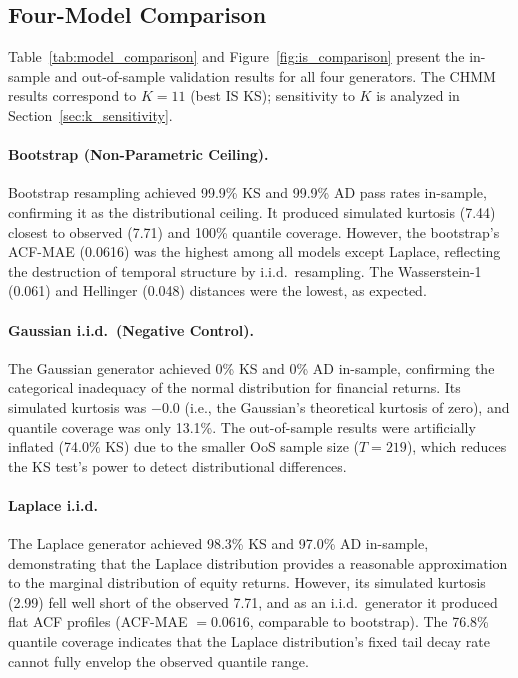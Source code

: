 \subsection{Four-Model Comparison}
\label{sec:model_comparison}

Table~\ref{tab:model_comparison} and Figure~\ref{fig:is_comparison} present the in-sample and out-of-sample validation results for all four generators.
The CHMM results correspond to $K = 11$ (best IS KS); sensitivity to $K$ is analyzed in Section~\ref{sec:k_sensitivity}.

\paragraph{Bootstrap (Non-Parametric Ceiling).}
Bootstrap resampling achieved 99.9\% KS and 99.9\% AD pass rates in-sample, confirming it as the distributional ceiling.
It produced simulated kurtosis (7.44) closest to observed (7.71) and 100\% quantile coverage.
However, the bootstrap's ACF-MAE (0.0616) was the highest among all models except Laplace, reflecting the destruction of temporal structure by i.i.d.\ resampling.
The Wasserstein-1 (0.061) and Hellinger (0.048) distances were the lowest, as expected.

\paragraph{Gaussian i.i.d.\ (Negative Control).}
The Gaussian generator achieved 0\% KS and 0\% AD in-sample, confirming the categorical inadequacy of the normal distribution for financial returns.
Its simulated kurtosis was $-0.0$ (i.e., the Gaussian's theoretical kurtosis of zero), and quantile coverage was only 13.1\%.
The out-of-sample results were artificially inflated (74.0\% KS) due to the smaller OoS sample size ($T = 219$), which reduces the KS test's power to detect distributional differences.

\paragraph{Laplace i.i.d.}
The Laplace generator achieved 98.3\% KS and 97.0\% AD in-sample, demonstrating that the Laplace distribution provides a reasonable approximation to the marginal distribution of equity returns.
However, its simulated kurtosis (2.99) fell well short of the observed 7.71, and as an i.i.d.\ generator it produced flat ACF profiles (ACF-MAE $= 0.0616$, comparable to bootstrap).
The 76.8\% quantile coverage indicates that the Laplace distribution's fixed tail decay rate cannot fully envelop the observed quantile range.

